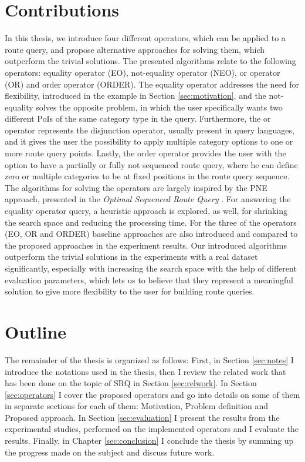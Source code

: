 \section{Contributions}
In this thesis, we introduce four different operators, which can be applied to a route query, and propose alternative approaches for solving them, which outperform the trivial solutions. The presented algorithms relate to the following operators: equality operator (EO), not-equality operator (NEO), or operator (OR) and order operator (ORDER). The equality operator addresses the need for flexibility, introduced in the example in Section \ref{sec:motivation}, and the not-equality solves the opposite problem, in which the user specifically wants two different PoIs of the same category type in the query. Furthermore, the or operator represents the disjunction operator, usually present in query languages, and it gives the user the possibility to apply multiple category options to one or more route query points. Lastly, the order operator provides the user with the option to have a partially or fully not sequenced route query, where he can define zero or multiple categories to be at fixed positions in the route query sequence. \newline
The algorithms for solving the operators are largely inspired by the PNE approach, presented in the \textit{Optimal Sequenced Route Query} \cite{OSR}. For answering the equality operator query, a heuristic approach is explored, as well, for shrinking the search space and reducing the processing time. For the three of the operators (EO, OR and ORDER) baseline approaches are also introduced and compared to the proposed approaches in the experiment results. Our introduced algorithms outperform the trivial solutions in the experiments with a real dataset significantly, especially with increasing the search space with the help of different evaluation parameters, which lets us to believe that they represent a meaningful solution to give more flexibility to the user for building route queries. 

\section{Outline}
The remainder of the thesis is organized as follows: First, in Section \ref{sec:notes} I introduce the notations used in the thesis, then I review the related work that has been done on the topic of SRQ in Section \ref{sec:relwork}. In Section \ref{sec:operators} I cover the proposed operators and go into details on some of them in separate sections for each of them: Motivation, Problem definition and Proposed approach. In Section \ref{sec:evaluation} I present the results from the experimental studies, performed on the implemented operators and I evaluate the results. Finally, in Chapter \ref{sec:conclusion} I conclude the thesis by summing up the progress made on the subject and discuss future work.